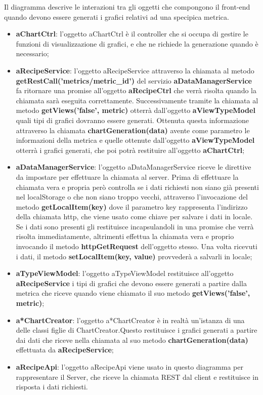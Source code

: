 	Il diagramma descrive le interazioni tra gli oggetti che compongono il front-end quando devono essere generati i grafici relativi ad una specipica metrica.
	\begin{itemize}
		\item \textbf{aChartCtrl}: l'oggetto aChartCtrl è il controller che si occupa di gestire le funzioni di visualizzazione di grafici, e che ne richiede la generazione quando è necessario;
		\item \textbf{aRecipeService}: l'oggetto aRecipeService attraverso la chiamata al metodo \textbf{getRestCall('metrics/metric\_id')} del servizio \textbf{aDataManagerService} fa ritornare una promise all'oggetto \textbf{aRecipeCtrl} che verrà risolta quando la chiamata sarà eseguita correttamente. Successivamente tramite la chiamata al metodo \textbf{getViews('false', metric)} otterrà dall'oggetto \textbf{aViewTypeModel} quali tipi di grafici dovranno essere generati. Ottenuta questa informazione attraverso la chiamata \textbf{chartGeneration(data)} avente come parametro le informazioni della metrica e quelle ottenute dall'oggetto \textbf{aViewTypeModel} otterrà i grafici generati, che poi potrà restituire all'oggetto \textbf{aChartCtrl};
		\item \textbf{aDataManagerService}: l'oggetto aDataManagerService riceve le direttive da impostare per effettuare la chiamata al server. Prima di effettuare la chiamata vera e propria però controlla se i dati richiesti non siano già presenti nel localStorage o che non siano troppo vecchi, attraverso l'invocazione del metodo \textbf{getLocalItem(key)} dove il parametro key rappresenta l'indirizzo della chiamata http, che viene usato come chiave per salvare i dati in locale. Se i dati sono presenti gli restituisce incapsulandoli in una promise che verrà risolta immediatamente, altrimenti effettua la chiamata vera e proprio invocando il metodo \textbf{httpGetRequest} dell'oggetto stesso. Una volta ricevuti i dati, il metodo \textbf{setLocalItem(key, value)} provvederà a salvarli in locale;
		\item \textbf{aTypeViewModel}: l'oggetto aTypeViewModel restituisce all'oggetto \textbf{aRecipeService} i tipi di grafici che devono essere generati a partire dalla metrica che riceve quando viene chiamato il suo metodo \textbf{getViews('false', metric)};
		\item \textbf{a*ChartCreator}: l'oggetto a*ChartCreator è in realtà un'istanza di una delle classi figlie di ChartCreator.Questo restituisce i grafici generati a partire dai dati che riceve nella chiamata al suo metodo \textbf{chartGeneration(data)} effettuata da \textbf{aRecipeService};
		\item \textbf{aRecipeApi}: l'oggetto aRecipeApi viene usato in questo diagramma per rappresentare il Server, che riceve la chiamata REST dal client e restituisce in risposta i dati richiesti.
	\end{itemize}
